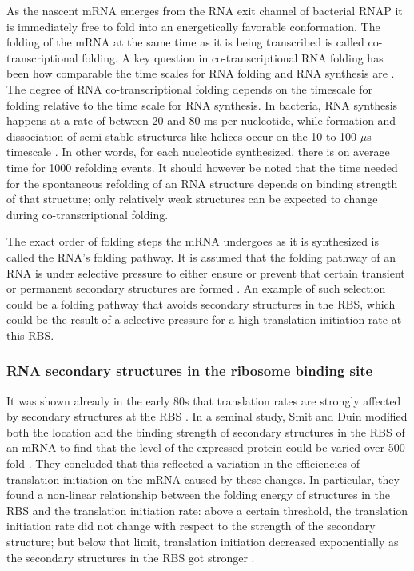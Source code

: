 As the nascent mRNA emerges from the RNA exit channel of bacterial RNAP it is
immediately free to fold into an energetically favorable conformation. The
folding of the mRNA at the same time as it is being transcribed is called
co-transcriptional folding. A key question in co-transcriptional RNA folding
has been how comparable the time scales for RNA folding and RNA synthesis are
\cite{de_smit_translational_2003}. The degree of RNA co-transcriptional folding
depends on the timescale for folding relative to the time scale for RNA
synthesis. In bacteria, RNA synthesis happens at a rate of between 20 and 80 ms
per nucleotide, while formation and dissociation of semi-stable structures like
helices occur on the 10 to 100 $\mu$s timescale \cite{isambert_jerky_2009}. In
other words, for each nucleotide synthesized, there is on average time for 1000
refolding events. It should however be noted that the time needed for the
spontaneous refolding of an RNA structure depends on binding strength of
that structure; only relatively weak structures can be expected to change
during co-transcriptional folding.

The exact order of folding steps the mRNA undergoes as it is synthesized is
called the RNA's folding pathway. It is assumed that the folding pathway of an
RNA is under selective pressure to either ensure or prevent that certain
transient or permanent secondary structures are formed \cite{pan_rna_2006}. An
example of such selection could be a folding pathway that avoids secondary
structures in the RBS, which could be the result of a selective pressure for a
high translation initiation rate at this RBS.

\subsubsection{RNA secondary structures in the ribosome binding site}
It was shown already in the early 80s that translation rates are strongly
affected by secondary structures at the RBS \cite{hall_role_1982}. In a seminal
study, Smit and Duin modified both the location and the binding strength of
secondary structures in the RBS of an mRNA to find that the level of the
expressed protein could be varied over 500 fold
\cite{de_smit_secondary_1990}. They concluded that this reflected a variation
in the efficiencies of translation initiation on the mRNA caused by these
changes. In particular, they found a non-linear relationship between the
folding energy of structures in the RBS and the translation initiation rate:
above a certain threshold, the translation initiation rate did not change with
respect to the strength of the secondary structure; but below that limit,
translation initiation decreased exponentially as the secondary structures in
the RBS got stronger \cite{de_smit_secondary_1990}.

